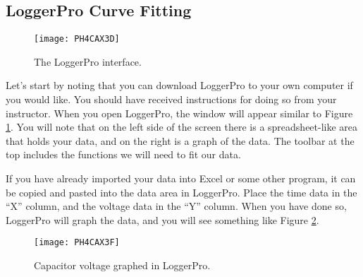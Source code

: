 \subsection{LoggerPro Curve Fitting}

\begin{figure}[htbp!]
	\centering
\texttt{[image: PH4CAX3D]}
	\caption{The LoggerPro interface.}
	\label{fig:loggerpro}
\end{figure}
Let's start by noting that you can download LoggerPro to your own computer
if you would like. You should have received instructions for doing so from 
your instructor.
When you open LoggerPro, the window will appear similar to 
Figure \ref{fig:loggerpro}.
You will note that on the left side of the screen there is a spreadsheet-like
area that holds your data, and on the right is a graph of the data. The toolbar
at the top includes the functions we will need to fit our data.

If you have already imported your data into Excel or some other program, it
can be copied and pasted into the data area in LoggerPro. Place the time data
in the ``X'' column, and the voltage data in the ``Y'' column. When you have 
done so, LoggerPro will graph the data, and you will see something like 
Figure \ref{fig:rc_datagraph}.


\begin{figure}[htbp!]
	\centering
\texttt{[image: PH4CAX3F]}
	\caption{Capacitor voltage graphed in LoggerPro.}
	\label{fig:rc_datagraph}
\end{figure}


